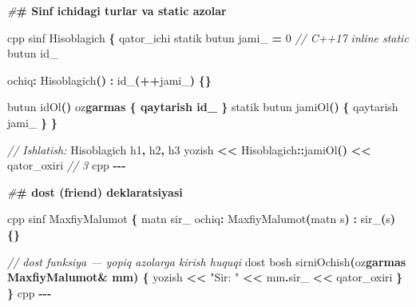 \documentclass[a4paper,11pt,twoside,openright]{book}
\newenvironment{Shaded}{\begin{snugshade}}{\end{snugshade}}
\newcommand{\CharTok}[1]{\textcolor[rgb]{0.31,0.60,0.02}{#1}}
\newcommand{\CommentTok}[1]{\textcolor[rgb]{0.56,0.35,0.01}{\textit{#1}}}
\newcommand{\DecValTok}[1]{\textcolor[rgb]{0.00,0.00,0.81}{#1}}
\newcommand{\ErrorTok}[1]{\textcolor[rgb]{0.64,0.00,0.00}{\textbf{#1}}}
\newcommand{\NormalTok}[1]{#1}
\newcommand{\OperatorTok}[1]{\textcolor[rgb]{0.81,0.36,0.00}{\textbf{#1}}}
\newcommand{\PreprocessorTok}[1]{\textcolor[rgb]{0.56,0.35,0.01}{\textit{#1}}}
\newcommand{\StringTok}[1]{\textcolor[rgb]{0.31,0.60,0.02}{#1}}
\newcommand{\VariableTok}[1]{\textcolor[rgb]{0.00,0.00,0.00}{#1}}
\begin{document}
\begin{Shaded}
\begin{Highlighting}[]
\PreprocessorTok{\#}\ErrorTok{\# Sinf ichidagi turlar va \textasciigrave{}static\textasciigrave{} a\textquotesingle{}zolar}

\ErrorTok{\textasciigrave{}\textasciigrave{}\textasciigrave{}}\NormalTok{cpp}
\NormalTok{sinf Hisoblagich }\OperatorTok{\{}
\NormalTok{    qator\_ichi statik butun }\VariableTok{jami\_} \OperatorTok{=} \DecValTok{0}   \CommentTok{// C++17 inline static}
\NormalTok{    butun }\VariableTok{id\_}

\NormalTok{ochiq}\OperatorTok{:}
\NormalTok{    Hisoblagich}\OperatorTok{()} \OperatorTok{:} \VariableTok{id\_}\OperatorTok{(++}\VariableTok{jami\_}\OperatorTok{)} \OperatorTok{\{\}}

\NormalTok{    butun idOl}\OperatorTok{()}\NormalTok{ o}\CharTok{\textquotesingle{}z}\ErrorTok{garmas \{ qaytarish id\_ \}}
\NormalTok{    statik butun jamiOl}\OperatorTok{()} \OperatorTok{\{}\NormalTok{ qaytarish }\VariableTok{jami\_} \OperatorTok{\}}
\OperatorTok{\}}

\CommentTok{// Ishlatish:}
\NormalTok{Hisoblagich h1}\OperatorTok{,}\NormalTok{ h2}\OperatorTok{,}\NormalTok{ h3}
\NormalTok{yozish }\OperatorTok{\textless{}\textless{}}\NormalTok{ Hisoblagich}\OperatorTok{::}\NormalTok{jamiOl}\OperatorTok{()} \OperatorTok{\textless{}\textless{}}\NormalTok{ qator\_oxiri   }\CommentTok{// 3}
\ErrorTok{\textasciigrave{}\textasciigrave{}\textasciigrave{}}\NormalTok{cpp}
\OperatorTok{{-}{-}{-}}

\PreprocessorTok{\#}\ErrorTok{\# \textasciigrave{}dost\textasciigrave{} (friend) deklaratsiyasi}

\ErrorTok{\textasciigrave{}\textasciigrave{}\textasciigrave{}}\NormalTok{cpp}
\NormalTok{sinf MaxfiyMalumot }\OperatorTok{\{}
\NormalTok{    matn }\VariableTok{sir\_}
\NormalTok{ochiq}\OperatorTok{:}
\NormalTok{    MaxfiyMalumot}\OperatorTok{(}\NormalTok{matn s}\OperatorTok{)} \OperatorTok{:} \VariableTok{sir\_}\OperatorTok{(}\NormalTok{s}\OperatorTok{)} \OperatorTok{\{\}}

    \CommentTok{// dost funksiya — yopiq a\textquotesingle{}zolarga kirish huquqi}
\NormalTok{    dost bosh sirniOchish}\OperatorTok{(}\NormalTok{o}\CharTok{\textquotesingle{}z}\ErrorTok{garmas MaxfiyMalumot\& mm) \{}
\NormalTok{        yozish }\OperatorTok{\textless{}\textless{}} \StringTok{"Sir: "} \OperatorTok{\textless{}\textless{}}\NormalTok{ mm}\OperatorTok{.}\VariableTok{sir\_} \OperatorTok{\textless{}\textless{}}\NormalTok{ qator\_oxiri}
    \OperatorTok{\}}
\OperatorTok{\}}
\ErrorTok{\textasciigrave{}\textasciigrave{}\textasciigrave{}}\NormalTok{cpp}
\OperatorTok{{-}{-}{-}}


\end{Highlighting}
\end{Shaded}
\end{document}
